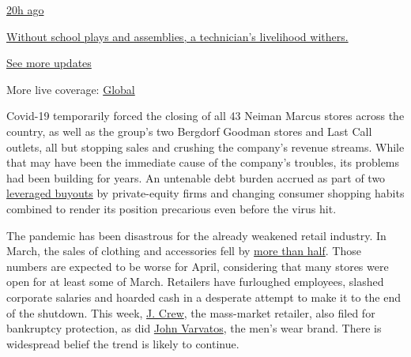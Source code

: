\href{https://www.nytimes3xbfgragh.onion/live/2020/08/20/business/stock-market-today-coronavirus?action=click\&pgtype=Article\&state=default\&region=MAIN_CONTENT_1\&context=storylines_live_updates\#without-school-plays-and-assemblies-a-technicians-livelihood-withers}{20h
ago}

\href{https://www.nytimes3xbfgragh.onion/live/2020/08/20/business/stock-market-today-coronavirus?action=click\&pgtype=Article\&state=default\&region=MAIN_CONTENT_1\&context=storylines_live_updates\#without-school-plays-and-assemblies-a-technicians-livelihood-withers}{Without
school plays and assemblies, a technician's livelihood withers.}

\href{https://www.nytimes3xbfgragh.onion/live/2020/08/20/business/stock-market-today-coronavirus?action=click\&pgtype=Article\&state=default\&region=MAIN_CONTENT_1\&context=storylines_live_updates}{See
more updates}

More live coverage:
\href{https://www.nytimes3xbfgragh.onion/2020/08/20/world/coronavirus-covid.html?action=click\&pgtype=Article\&state=default\&region=MAIN_CONTENT_1\&context=storylines_live_updates}{Global}

Covid-19 temporarily forced the closing of all 43 Neiman Marcus stores
across the country, as well as the group's two Bergdorf Goodman stores
and Last Call outlets, all but stopping sales and crushing the company's
revenue streams. While that may have been the immediate cause of the
company's troubles, its problems had been building for years. An
untenable debt burden accrued as part of two
\href{https://dealbook.nytimes3xbfgragh.onion/2013/09/09/neiman-marcus-is-sold-for-6-billion/}{leveraged
buyouts} by private-equity firms and changing consumer shopping habits
combined to render its position precarious even before the virus hit.

The pandemic has been disastrous for the already weakened retail
industry. In March, the sales of clothing and accessories fell by
\href{https://www.nytimes3xbfgragh.onion/2020/04/15/business/economy/coronavirus-retail-sales.html?searchResultPosition=1}{more
than half}. Those numbers are expected to be worse for April,
considering that many stores were open for at least some of March.
Retailers have furloughed employees, slashed corporate salaries and
hoarded cash in a desperate attempt to make it to the end of the
shutdown. This week,
\href{https://www.nytimes3xbfgragh.onion/2020/05/03/business/j-crew-bankruptcy-coronavirus.html}{J.
Crew}, the mass-market retailer, also filed for bankruptcy protection,
as did
\href{https://www.bloomberg.com/news/articles/2020-05-06/rock-star-outfitter-john-varvatos-s-firm-files-for-bankruptcy}{John
Varvatos}, the men's wear brand. There is widespread belief the trend is
likely to continue.

